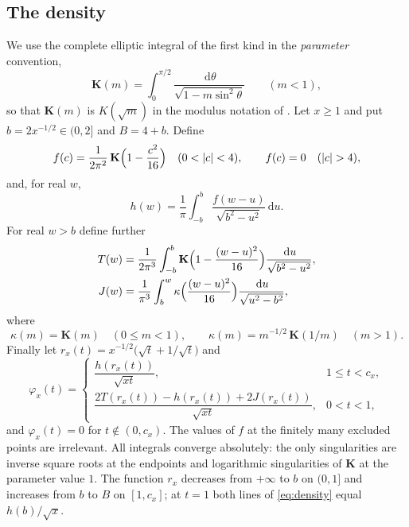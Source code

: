 \documentclass[11pt]{amsart}
\numberwithin{equation}{section}
\theoremstyle{definition}
\theoremstyle{remark}
\newcommand{\dd}{\,\mathrm{d}}
\newcommand{\Kc}{\mathbf{K}}
\begin{document}
\subsection*{The density}
We use the complete elliptic integral of the first kind in the
\emph{parameter} convention,
\begin{equation}\label{eq:K}
\Kc(m)=\int_0^{\pi/2}\frac{\dd\theta}{\sqrt{1-m\sin^2\theta}}\qquad(m<1),
\end{equation}
so that $\Kc(m)$ is $K(\sqrt m)$ in the modulus notation of \cite{DLMF}. Let
$x\ge1$ and put $b=2x^{-1/2}\in(0,2]$ and $B=4+b$. Define
\begin{equation}\label{eq:f}
f(c)=\frac{1}{2\pi^2}\,\Kc\Bigl(1-\frac{c^2}{16}\Bigr)\quad(0<|c|<4),\qquad
f(c)=0\quad(|c|>4),
\end{equation}
and, for real $w$,
\begin{equation}\label{eq:h}
h(w)=\frac1\pi\int_{-b}^{b}\frac{f(w-u)}{\sqrt{b^2-u^2}}\dd u .
\end{equation}
For real $w>b$ define further
\begin{align}
T(w)&=\frac{1}{2\pi^3}\int_{-b}^{b}\Kc\Bigl(1-\frac{(w-u)^2}{16}\Bigr)
\frac{\dd u}{\sqrt{b^2-u^2}},\label{eq:T}\\
J(w)&=\frac{1}{\pi^3}\int_{b}^{w}\kappa\Bigl(\frac{(w-u)^2}{16}\Bigr)
\frac{\dd u}{\sqrt{u^2-b^2}},\label{eq:J}
\end{align}
where
\begin{equation}\label{eq:kappa}
\kappa(m)=\Kc(m)\quad(0\le m<1),\qquad
\kappa(m)=m^{-1/2}\,\Kc(1/m)\quad(m>1).
\end{equation}
Finally let $r_x(t)=x^{-1/2}\bigl(\sqrt t+1/\sqrt t\bigr)$ and
\begin{equation}\label{eq:density}
\varphi_x(t)=
\begin{cases}
\dfrac{h(r_x(t))}{\sqrt{xt}}, & 1\le t<c_x,\\[2ex]
\dfrac{2T(r_x(t))-h(r_x(t))+2J(r_x(t))}{\sqrt{xt}}, & 0<t<1,
\end{cases}
\end{equation}
and $\varphi_x(t)=0$ for $t\notin(0,c_x)$. The values of $f$ at the finitely
many excluded points are irrelevant. All integrals converge absolutely: the
only singularities are inverse square roots at the endpoints and logarithmic
singularities of $\Kc$ at the parameter value $1$. The function $r_x$
decreases from $+\infty$ to $b$ on $(0,1]$ and increases from $b$ to $B$ on
$[1,c_x]$; at $t=1$ both lines of \eqref{eq:density} equal $h(b)/\sqrt x$.
\end{document}
